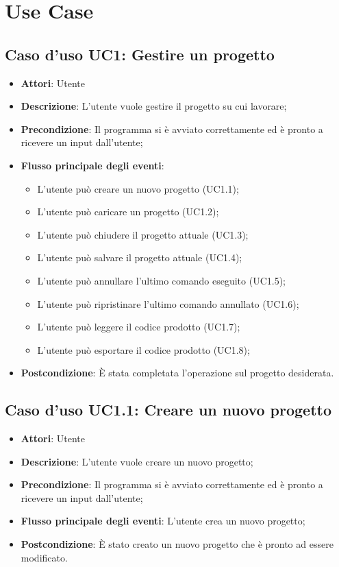 \documentclass[../AnalisiDeiRequisiti.tex]{subfiles}
\begin{document}
	\section{Use Case}
	\subsection{Caso d'uso UC1: Gestire un progetto}
	\begin{itemize}
		\item \textbf{Attori}: Utente
		\item \textbf{Descrizione}: L'utente vuole gestire il progetto su cui lavorare;
		\item \textbf{Precondizione}: Il programma si è avviato correttamente ed è pronto a ricevere un input dall'utente;
		\item \textbf{Flusso principale degli eventi}: \begin{itemize}
			\item L'utente può creare un nuovo progetto (UC1.1);
			\item L'utente può caricare un progetto (UC1.2);
			\item L'utente può chiudere il progetto attuale (UC1.3);
			\item L'utente può salvare il progetto attuale (UC1.4);
			\item L'utente può annullare l'ultimo comando eseguito (UC1.5);
			\item L'utente può ripristinare l'ultimo comando annullato (UC1.6);
			\item L'utente può leggere il codice prodotto (UC1.7);
			\item L'utente può esportare il codice prodotto (UC1.8);
		\end{itemize}
		\item \textbf{Postcondizione}: È stata completata l'operazione sul progetto desiderata.
	\end{itemize}
	\subsection{Caso d'uso UC1.1: Creare un nuovo progetto}
	\begin{itemize}
		\item \textbf{Attori}: Utente
		\item \textbf{Descrizione}: L'utente vuole creare un nuovo progetto;
		\item \textbf{Precondizione}: Il programma si è avviato correttamente ed è pronto a ricevere un input dall'utente;
		\item \textbf{Flusso principale degli eventi}: L'utente crea un nuovo progetto;
		\item \textbf{Postcondizione}: È stato creato un nuovo progetto che è pronto ad essere modificato.
	\end{itemize}
\end{document}
